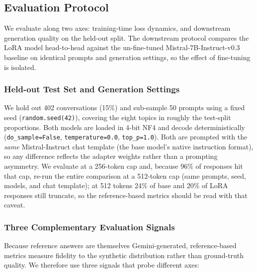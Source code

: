 \documentclass[11pt, a4paper]{article}
\begin{document}
\subsection{Evaluation Protocol}
\label{sec:evaluation}
We evaluate along two axes: training-time loss dynamics, and downstream generation quality on the held-out split. The downstream protocol compares the LoRA model head-to-head against the un-fine-tuned Mistral-7B-Instruct-v0.3 baseline on identical prompts and generation settings, so the effect of fine-tuning is isolated.

\subsubsection{Held-out Test Set and Generation Settings}
We hold out 402 conversations (15\%) and sub-sample 50 prompts using a fixed seed (\texttt{random.seed(42)}), covering the eight topics in roughly the test-split proportions. Both models are loaded in 4-bit NF4 and decode deterministically (\texttt{do\_sample=False}, \texttt{temperature=0.0}, \texttt{top\_p=1.0}). Both are prompted with the \emph{same} Mistral-Instruct chat template (the base model's native instruction format), so any difference reflects the adapter weights rather than a prompting asymmetry. We evaluate at a 256-token cap and, because 96\% of responses hit that cap, re-run the entire comparison at a 512-token cap (same prompts, seed, models, and chat template); at 512 tokens 24\% of base and 20\% of LoRA responses still truncate, so the reference-based metrics should be read with that caveat.

\subsubsection{Three Complementary Evaluation Signals}
Because reference answers are themselves Gemini-generated, reference-based metrics measure fidelity to the synthetic distribution rather than ground-truth quality. We therefore use three signals that probe different axes:
\end{document}
